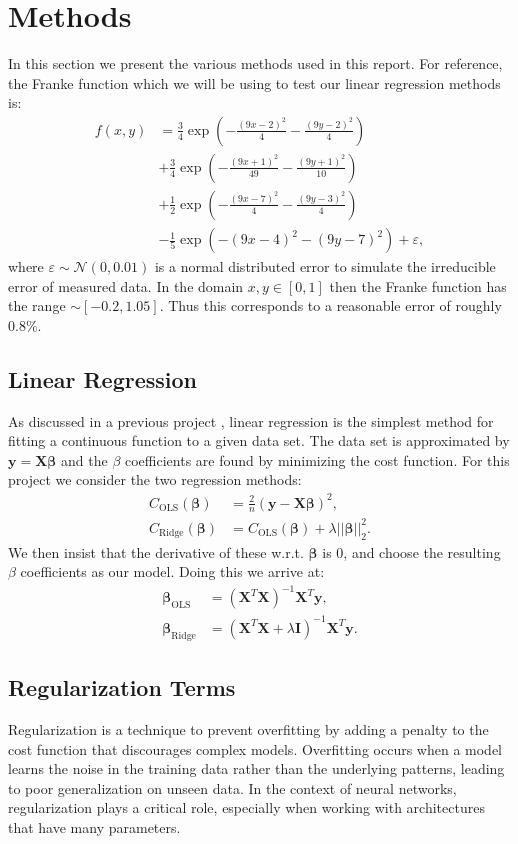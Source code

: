 \documentclass[%
reprint,s
amsmath,amssymb,
aps,
]{revtex4-2}
\begin{document}
\section{Methods}
In this section we present the various methods used in this report. For reference, the Franke function which we will be using to test our linear regression methods is:
\begin{align}	\label{eq:franke}
	f(x,y)&=\frac{3}{4}\exp(-\frac{(9x-2)^2}{4}-\frac{(9y-2)^2}{4})\nonumber\\
	&+\frac{3}{4}\exp(-\frac{(9x+1)^2}{49}-\frac{(9y+1)^2}{10})\nonumber\\
	&+\frac{1}{2}\exp(-\frac{(9x-7)^2}{4}-\frac{(9y-3)^2}{4})\nonumber\\
	&-\frac{1}{5}\exp(-(9x-4)^2-(9y-7)^2)+\varepsilon,
\end{align}
where $\varepsilon\sim\mathcal{N}(0,0.01)$ is a normal distributed error to simulate the irreducible error of measured data. In the domain $x,y\in[0,1]$ then the Franke function has the range $\sim[-0.2,1.05]$. Thus this corresponds to a reasonable error of roughly $0.8\%$. 

\subsection{Linear Regression}
As discussed in a previous project \cite{project1}, linear regression is the simplest method for fitting a continuous function to a given data set. The data set is approximated by $\bm y=\bm X\bm\beta$ and the $\beta$ coefficients are found by minimizing the cost function. For this project we consider the two regression methods:
\begin{align}
	C_\text{OLS}(\bm\beta)&=\frac{2}{n}(\bm y-\bm X\bm\beta)^2,\\
	C_\text{Ridge}(\bm\beta)&=C_\text{OLS}(\bm\beta)+\lambda||\bm\beta||_2^2.
\end{align}
We then insist that the derivative of these w.r.t. $\bm\beta$ is $0$, and choose the resulting $\beta$ coefficients as our model. Doing this we arrive at:
\begin{align}
	\bm\beta_\text{OLS}&=(\bm X^T\bm X)^{-1}\bm X^T\bm y,\\
	\bm\beta_\text{Ridge}&=(\bm X^T\bm X+\lambda \bm I)^{-1}\bm X^T\bm y.
\end{align}

\subsection{Regularization Terms}
Regularization is a technique to prevent overfitting by adding a penalty to the cost function that discourages complex models. Overfitting occurs when a model learns the noise in the training data rather than the underlying patterns, leading to poor generalization on unseen data. In the context of neural networks, regularization plays a critical role, especially when working with architectures that have many parameters.
\end{document}
